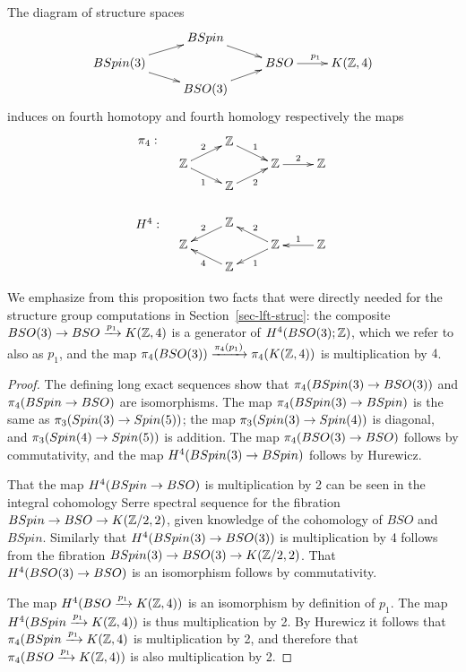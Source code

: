 \documentclass{amsart}
\begin{document}
\begin{proposition} \label{prop-H4}
The diagram of structure spaces
\begin{equation} \nn
\xymatrix@R=5pt{
& BSpin \ar[dr] & & \\
BSpin(3) \ar[ur] \ar[dr] && BSO \ar[r]^{p_1} & K(\ZZ,4) \\
& BSO(3) \ar[ur] & &
}
\end{equation}
induces on fourth homotopy and fourth homology respectively the maps
\begin{equation} \nn
\xymatrix@R=5pt{
\save[]+<-1cm,0cm>*{\pi_4:}\restore & \ZZ \ar[dr]^{1} & & \\
\ZZ \ar[ur]^{2} \ar[dr]_{1} && \ZZ \ar[r]^{2} & \ZZ \\
& \ZZ \ar[ur]_{2} & & \\
&&& \\
\save[]+<-1cm,0cm>*{H^4:}\restore & \ZZ \ar[dl]_{2} & & \\
\ZZ && \ZZ \ar[ul]_{2} \ar[dl]^{1} & \ZZ \ar[l]_{1} \\
& \ZZ \ar[ul]^{4} & &
}
\end{equation}
\end{proposition}

We emphasize from this proposition two facts that were directly needed for the structure group computations in Section~\ref{sec-lft-struc}: the composite $BSO(3) \rightarrow BSO \xrightarrow{p_1} K(\mathbb Z,4)$ is a generator of $H^4(BSO(3);\mathbb Z)$, which we refer to also as $p_1$, and the map $\pi_4(BSO(3)) \xrightarrow{\pi_4(p_1)} \pi_4(K(\mathbb Z,4))$ is multiplication by $4$.

\begin{proof}
The defining long exact sequences show that $\pi_4(BSpin(3) \rightarrow BSO(3))$ and $\pi_4(BSpin \rightarrow BSO)$ are isomorphisms.  The map $\pi_4(BSpin(3) \rightarrow BSpin)$ is the same as $\pi_3(Spin(3) \rightarrow Spin(5))$; the map $\pi_3(Spin(3) \rightarrow Spin(4))$ is diagonal, and $\pi_3(Spin(4) \rightarrow Spin(5))$ is addition. %
The map $\pi_4(BSO(3) \rightarrow BSO)$ follows by commutativity, and the map $H^4(BSpin(3) \rightarrow BSpin)$ follows by Hurewicz.

That the map $H^4(BSpin \rightarrow BSO)$ is multiplication by 2 can be seen in the integral cohomology Serre spectral sequence for the fibration $BSpin \rightarrow BSO \rightarrow K(\mathbb Z/2,2)$, given knowledge of the cohomology of $BSO$ and $BSpin$.  Similarly that $H^4(BSpin(3) \rightarrow BSO(3))$ is multiplication by 4 follows from the fibration $BSpin(3) \rightarrow BSO(3) \rightarrow K(\mathbb Z/2,2)$.  That $H^4(BSO(3) \rightarrow BSO)$ is an isomorphism follows by commutativity.

The map $H^4(BSO \xrightarrow{p_1} K(\mathbb Z,4))$ is an isomorphism by definition of $p_1$.  The map $H^4(BSpin \xrightarrow{p_1} K(\mathbb Z,4))$ is thus multiplication by 2.  By Hurewicz it follows that $\pi_4(BSpin \xrightarrow{p_1} K(\mathbb Z,4)$ is multiplication by 2, and therefore that $\pi_4(BSO \xrightarrow{p_1} K(\mathbb Z,4))$ is also multiplication by 2.
\end{proof}
\end{document}
